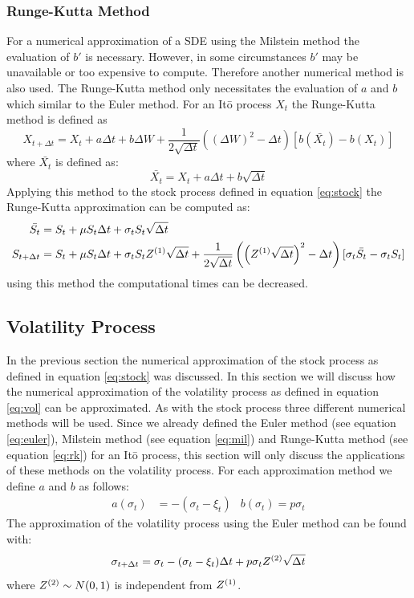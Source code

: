 \documentclass[a4paper,onecolumn,draft]{IEEEtran}
\begin{document}
\subsubsection{Runge-Kutta Method}
For a numerical approximation of a SDE using the Milstein method the
evaluation of $b'$ is necessary. However, in some circumstances $b'$ may be
unavailable or too expensive to compute. Therefore another numerical method
is also used. The Runge-Kutta method only necessitates the evaluation of $a$
and $b$ which similar to the Euler method. For an It\=o process $X_t$ the
Runge-Kutta method is defined as
\begin{equation}\label{eq:rk}
X_{t + \Delta t} = X_t + a\Delta t + b\Delta W + \frac{1}{2\sqrt{\Delta
t}}\left(\left(\Delta W\right)^2 - \Delta
t\right)[b\left(\bar{X_t}\right)-b(X_t)]
\end{equation}
where $\bar{X_t}$ is defined as:
\begin{equation}
\bar{X_t} = X_t + a\Delta t + b \sqrt{\Delta t}
\end{equation}
Applying this method to the stock process defined in equation \eqref{eq:stock}
the Runge-Kutta approximation can be computed as:
\begin{equation}
\begin{split}
\bar{S_t} &= S_t + \mu S_t\Delta t + \sigma_t S_t \sqrt{\Delta t}\\
S_{t + \Delta t} &= S_t + \mu S_t \Delta t + \sigma_t S_t Z^{(1)}\sqrt{\Delta
t} + \frac{1}{2\sqrt{\Delta t}}\left(\left(Z^{(1)}\sqrt{\Delta t}\right)^2 -
\Delta t\right)[\sigma_t\bar{S_t} - \sigma_t S_t]
\end{split}
\end{equation}
using this method the computational times can be decreased.

\subsection{Volatility Process}
In the previous section the numerical approximation of the stock process as
defined in equation \eqref{eq:stock} was discussed. In this section we will
discuss how the numerical approximation of the volatility process as defined
in equation \eqref{eq:vol} can be approximated. As with the stock process three
different numerical methods will be used. Since we already defined the Euler
method (see equation \eqref{eq:euler}), Milstein method (see equation
\eqref{eq:mil}) and Runge-Kutta method (see equation \eqref{eq:rk}) for an
It\=o process, this section will only discuss the applications of these
methods on the volatility process. For each approximation method we define $a$
and $b$ as follows:
\begin{align}
a(\sigma_t)&= -(\sigma_t - \xi_t) & b(\sigma_t) = p\sigma_t
\end{align}
The approximation of the volatility process using the Euler method can be
found with:
\begin{equation}
\sigma_{t + \Delta t} = \sigma_t - (\sigma_t - \xi_t)\Delta t +
	p\sigma_tZ^{(2)}\sqrt{\Delta t}
\end{equation}
where $Z^{(2)}\sim N(0, 1)$ is independent from $Z^{(1)}$.
\end{document}
